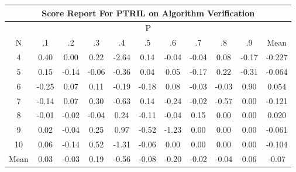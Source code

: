 \documentclass[11pt,a4paper]{report}
\begin{document}
\begin{longtable}{ | c || c | c | c | c | c | c | c | c | c || c |}
\hline
\multicolumn{11}{|c|}{ Score Report For PTRIL on Algorithm Verification} \\
\hline
\multicolumn{11}{|c|}{ P } \\
\hline
N & .1 & .2 & .3 & .4 & .5 & .6 & .7 & .8 & .9 & Mean\\
 \hline
 \hline
 \endhead
  4 &  \cellcolor[HTML]{F7F7FF} 0.40 &  \cellcolor[HTML]{FFFFFF} 0.00 &  \cellcolor[HTML]{F7F7FF} 0.22 &  \cellcolor[HTML]{FFBFBF} -2.64 &  \cellcolor[HTML]{FFFFFF} 0.14 &  \cellcolor[HTML]{FFFFFF} -0.04 &  \cellcolor[HTML]{FFFFFF} -0.04 &  \cellcolor[HTML]{FFFFFF} 0.08 &  \cellcolor[HTML]{FFF7F7} -0.17 & -0.227 \\
  5 &  \cellcolor[HTML]{FFFFFF} 0.15 &  \cellcolor[HTML]{FFFFFF} -0.14 &  \cellcolor[HTML]{FFFFFF} -0.06 &  \cellcolor[HTML]{FFF7F7} -0.36 &  \cellcolor[HTML]{FFFFFF} 0.04 &  \cellcolor[HTML]{FFFFFF} 0.05 &  \cellcolor[HTML]{FFF7F7} -0.17 &  \cellcolor[HTML]{F7F7FF} 0.22 &  \cellcolor[HTML]{FFF7F7} -0.31 & -0.064 \\
  6 &  \cellcolor[HTML]{FFF7F7} -0.25 &  \cellcolor[HTML]{FFFFFF} 0.07 &  \cellcolor[HTML]{FFFFFF} 0.11 &  \cellcolor[HTML]{FFF7F7} -0.19 &  \cellcolor[HTML]{FFF7F7} -0.18 &  \cellcolor[HTML]{FFFFFF} 0.08 &  \cellcolor[HTML]{FFFFFF} -0.03 &  \cellcolor[HTML]{FFFFFF} -0.03 &  \cellcolor[HTML]{E7E7FF} 0.90 & 0.054 \\
  7 &  \cellcolor[HTML]{FFFFFF} -0.14 &  \cellcolor[HTML]{FFFFFF} 0.07 &  \cellcolor[HTML]{F7F7FF} 0.30 &  \cellcolor[HTML]{FFEFEF} -0.63 &  \cellcolor[HTML]{FFFFFF} 0.14 &  \cellcolor[HTML]{FFF7F7} -0.24 &  \cellcolor[HTML]{FFFFFF} -0.02 &  \cellcolor[HTML]{FFEFEF} -0.57 &  \cellcolor[HTML]{FFFFFF} 0.00 & -0.121 \\
  8 &  \cellcolor[HTML]{FFFFFF} -0.01 &  \cellcolor[HTML]{FFFFFF} -0.02 &  \cellcolor[HTML]{FFFFFF} -0.04 &  \cellcolor[HTML]{F7F7FF} 0.24 &  \cellcolor[HTML]{FFFFFF} -0.11 &  \cellcolor[HTML]{FFFFFF} -0.04 &  \cellcolor[HTML]{FFFFFF} 0.15 &  \cellcolor[HTML]{FFFFFF} 0.00 &  \cellcolor[HTML]{FFFFFF} 0.00 & 0.020 \\
  9 &  \cellcolor[HTML]{FFFFFF} 0.02 &  \cellcolor[HTML]{FFFFFF} -0.04 &  \cellcolor[HTML]{F7F7FF} 0.25 &  \cellcolor[HTML]{E7E7FF} 0.97 &  \cellcolor[HTML]{FFEFEF} -0.52 &  \cellcolor[HTML]{FFDFDF} -1.23 &  \cellcolor[HTML]{FFFFFF} 0.00 &  \cellcolor[HTML]{FFFFFF} 0.00 &  \cellcolor[HTML]{FFFFFF} 0.00 & -0.061 \\
  10 &  \cellcolor[HTML]{FFFFFF} 0.06 &  \cellcolor[HTML]{FFFFFF} -0.14 &  \cellcolor[HTML]{EFEFFF} 0.52 &  \cellcolor[HTML]{FFDFDF} -1.31 &  \cellcolor[HTML]{FFFFFF} -0.06 &  \cellcolor[HTML]{FFFFFF} 0.00 &  \cellcolor[HTML]{FFFFFF} 0.00 &  \cellcolor[HTML]{FFFFFF} 0.00 &  \cellcolor[HTML]{FFFFFF} 0.00 & -0.104 \\
 \hline
 \hline
Mean &  \cellcolor[HTML]{FFFFFF} 0.03 &  \cellcolor[HTML]{FFFFFF} -0.03 &  \cellcolor[HTML]{F7F7FF} 0.19 &  \cellcolor[HTML]{FFEFEF} -0.56 &  \cellcolor[HTML]{FFFFFF} -0.08 &  \cellcolor[HTML]{FFF7F7} -0.20 &  \cellcolor[HTML]{FFFFFF} -0.02 &  \cellcolor[HTML]{FFFFFF} -0.04 &  \cellcolor[HTML]{FFFFFF} 0.06 &  \cellcolor[HTML]{FFFFFF} -0.07
\end{longtable}
\end{document}
